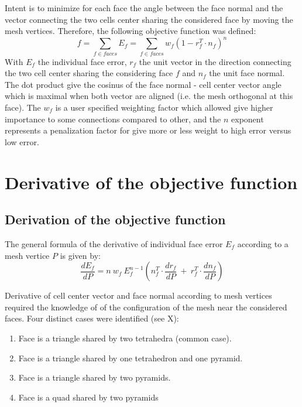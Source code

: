 \documentclass[11pt]{article}
\begin{document}
Intent is to minimize for each face the angle between the face normal and the vector connecting the two cells center sharing the considered face by moving the mesh vertices. Therefore, the following objective function was defined:
\begin{equation}
f = \sum_{f \in faces} E_f = \sum_{f \in faces} w_f \left( 1 - r_f^T \cdot n_f \right) ^n
\label{objective_function}
\end{equation}
With $E_f$ the individual face error, $r_f$ the unit vector in the direction connecting the two cell center sharing the considering face $f$ and $n_f$ the unit face normal. 
The dot product give the cosinus of the face normal - cell center vector angle which is maximal when both vector are aligned (i.e. the mesh orthogonal at this face). 
The $w_f$ is a user specified weighting factor which allowed give higher importance to some connections compared to other, and the $n$ exponent represents a penalization factor for give more or less weight to high error versus low error. 

\section{Derivative of the objective function}

\subsection{Derivation of the objective function}

The general formula of the derivative of individual face error $E_f$ according to a mesh vertice $P$ is given by:
\begin{equation}
\frac{dE_f}{dP} = n\ w_f\ E_f^{n-1} \left(n_f^T \cdot \frac{d r_f}{dP}\ +\ r_f^T \cdot \frac{d n_f}{dP}\right)
\label{general_derivative_expression}
\end{equation}

Derivative of cell center vector and face normal according to mesh vertices required the knowledge of of the configuration of the mesh near the considered faces. Four distinct cases were identified (see X):
\begin{enumerate}
  \item Face is a triangle shared by two tetrahedra (common case). 
  \item Face is a triangle shared by one tetrahedron and one pyramid.
  \item Face is a triangle shared by two pyramids.
  \item Face is a quad shared by two pyramids
\end{enumerate}
\end{document}
